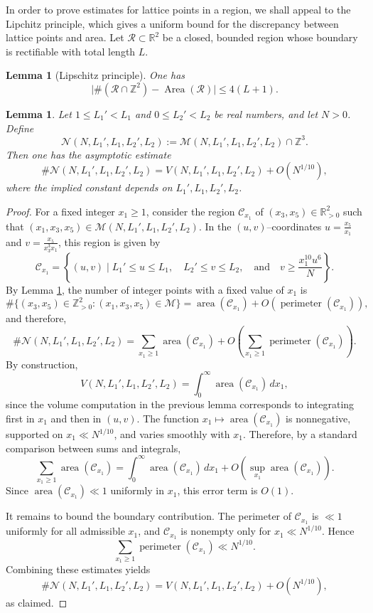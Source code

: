 \documentclass[table]{amsart}
\newtheorem{lemma}[theorem]{Lemma}
\newcommand{\op}[1]{\operatorname{#1}}
\numberwithin{equation}{section}
\begin{document}
\par
In order to prove estimates for lattice points in a region, we shall appeal to the Lipchitz principle, which gives a uniform bound for the
discrepancy between lattice points and area. Let $\mathcal{R}\subset\mathbb{R}^2$ be a closed, bounded region whose
boundary is rectifiable with total length $L$. 

\begin{lemma}[Lipschitz principle]\label{davenport}
One has
\[
\bigl|\#(\mathcal{R}\cap\mathbb{Z}^2)-\op{Area}(\mathcal{R})\bigr|
\le 4(L+1).
\]
\end{lemma}


\begin{lemma}\label{hashtag N lemma}
Let $1\le L_1'<L_1$ and $0\le L_2'<L_2$ be real numbers, and let $N>0$.
Define
\[
\mathcal{N}(N,L_1',L_1,L_2',L_2)
:=\mathcal{M}(N,L_1',L_1,L_2',L_2)\cap \mathbb{Z}^3.
\]
Then one has the asymptotic estimate
\[
\#\mathcal{N}(N,L_1',L_1,L_2',L_2)
=
V(N,L_1',L_1,L_2',L_2)
+
O\!\left(N^{1/10}\right),
\]
where the implied constant depends on $L_1',L_1,L_2',L_2$.
\end{lemma}

\begin{proof}
For a fixed integer $x_1\ge 1$, consider the region $\mathcal{C}_{x_1}$ of $(x_3,x_5)\in\mathbb{R}_{>0}^2$
such that $(x_1,x_3,x_5)\in\mathcal{M}(N,L_1',L_1,L_2',L_2)$.
In the $(u,v)$–coordinates $u=\frac{x_5}{x_1}$ and $v=\frac{x_5}{x_3^3 x_1}$, this region is given by
\[
\mathcal{C}_{x_1}=\left\{(u,v)\mid L_1'\le u\le L_1,\quad
L_2'\le v\le L_2,\quad\text{and}\quad
v\ge \frac{x_1^{10}u^6}{N}\right\}.\]
By Lemma \ref{davenport}, the number of integer points with a fixed value of $x_1$ is
\[
\#\{(x_3,x_5)\in\mathbb{Z}_{>0}^2 : (x_1,x_3,x_5)\in\mathcal{M}\}
=
\op{area}(\mathcal{C}_{x_1})
+
O\!\left(\op{perimeter}(\mathcal{C}_{x_1})\right),
\]
and therefore,
\[
\#\mathcal{N}(N,L_1',L_1,L_2',L_2)
=
\sum_{x_1\ge 1} \op{area}(\mathcal{C}_{x_1})
+
O\!\left(\sum_{x_1\ge 1}\op{perimeter}(\mathcal{C}_{x_1})\right).
\]
By construction,
\[
V(N,L_1',L_1,L_2',L_2)
=
\int_{0}^{\infty} \op{area}(\mathcal{C}_{x_1})\,dx_1,
\]
since the volume computation in the previous lemma corresponds to
integrating first in $x_1$ and then in $(u,v)$.
The function $x_1\mapsto \op{area}(\mathcal{C}_{x_1})$ is nonnegative,
supported on $x_1\ll N^{1/10}$, and varies smoothly with $x_1$.
Therefore, by a standard comparison between sums and integrals,
\[
\sum_{x_1\ge 1} \op{area}(\mathcal{C}_{x_1})
=
\int_{0}^{\infty} \op{area}(\mathcal{C}_{x_1})\,dx_1
+
O\!\left(\sup_{x_1}\op{area}(\mathcal{C}_{x_1})\right).
\]
Since $\op{area}(\mathcal{C}_{x_1})\ll 1$ uniformly in $x_1$,
this error term is $O(1)$.

It remains to bound the boundary contribution.
The perimeter of $\mathcal{C}_{x_1}$ is $\ll 1$ uniformly for all
admissible $x_1$, and $\mathcal{C}_{x_1}$ is nonempty only for
$x_1\ll N^{1/10}$. Hence
\[
\sum_{x_1\ge 1}\op{perimeter}(\mathcal{C}_{x_1})
\ll N^{1/10}.
\]
Combining these estimates yields
\[
\#\mathcal{N}(N,L_1',L_1,L_2',L_2)
=
V(N,L_1',L_1,L_2',L_2)
+
O\!\left(N^{1/10}\right),
\]
as claimed.
\end{proof}
\end{document}
